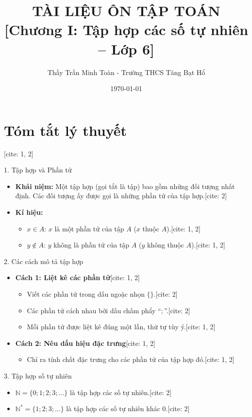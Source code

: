\documentclass[12pt,a4paper]{article}
\title{\textbf{TÀI LIỆU ÔN TẬP TOÁN}\\[0.5em]\large [Chương I: Tập hợp các số tự nhiên -- Lớp 6]}
\author{Thầy Trần Minh Toàn - Trường THCS Tăng Bạt Hổ}
\date{\today}
\begin{document}
\maketitle

\section{Tóm tắt lý thuyết}[cite: 1, 2]

\begin{kienthucbox}{1. Tập hợp và Phần tử}
\begin{itemize}
    \item \textbf{Khái niệm:} Một tập hợp (gọi tắt là tập) bao gồm những đối tượng nhất định. Các đối tượng ấy được gọi là những phần tử của tập hợp.[cite: 2]
    \item \textbf{Kí hiệu:}
    \begin{itemize}
        \item $x \in A$: $x$ là một phần tử của tập $A$ ($x$ thuộc $A$).[cite: 1, 2]
        \item $y \notin A$: $y$ không là phần tử của tập $A$ ($y$ không thuộc $A$).[cite: 1, 2]
    \end{itemize}
\end{itemize}
\end{kienthucbox}

\begin{kienthucbox}{2. Các cách mô tả tập hợp}
\begin{itemize}
    \item \textbf{Cách 1: Liệt kê các phần tử}[cite: 1, 2]
    \begin{itemize}
        \item Viết các phần tử trong dấu ngoặc nhọn $\{ \}$.[cite: 2]
        \item Các phần tử cách nhau bởi dấu chấm phẩy ``$;$''.[cite: 2]
        \item Mỗi phần tử được liệt kê đúng một lần, thứ tự tùy ý.[cite: 1, 2]
    \end{itemize}
    \item \textbf{Cách 2: Nêu dấu hiệu đặc trưng}[cite: 1, 2]
    \begin{itemize}
        \item Chỉ ra tính chất đặc trưng cho các phần tử của tập hợp đó.[cite: 1, 2]
    \end{itemize}
\end{itemize}
\end{kienthucbox}

\begin{kienthucbox}{3. Tập hợp số tự nhiên}
\begin{itemize}
    \item $\mathbb{N} = \{0; 1; 2; 3; \dots\}$ là tập hợp các số tự nhiên.[cite: 2]
    \item $\mathbb{N}^* = \{1; 2; 3; \dots\}$ là tập hợp các số tự nhiên khác $0$.[cite: 2]
\end{itemize}
\end{kienthucbox}
\end{document}
